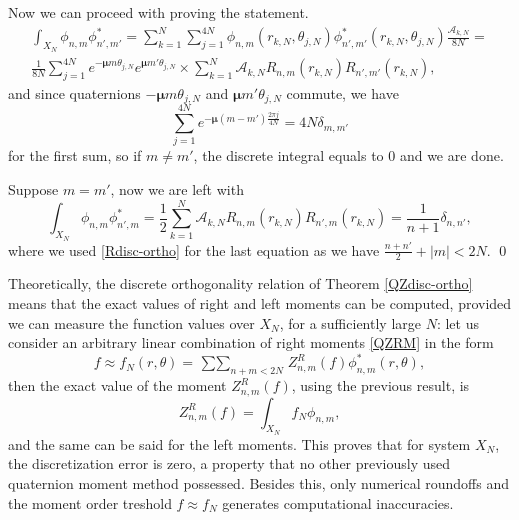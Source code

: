 \documentclass[12pt]{article}
\newcommand{\qmu}{\boldsymbol{\mu}}
\begin{document}
Now we can proceed with proving the statement. 
\[
\begin{gathered}
	\int_{X_N} \phi_{n,m} \phi^*_{n',m'} = \sum_{k=1}^{N} \sum_{j=1}^{4N} \phi_{n,m}(r_{k,N},\theta_{j,N}) \phi^*_{n',m'}(r_{k,N},					\theta_{j,N}) \frac{\mathcal{A}_{k,N}}{8N} = \\
	\frac{1}{8N} \sum_{j=1}^{4N} e^{-\qmu m\theta_{j,N}}e^{\qmu m' \theta_{j,N}} \times \sum_{k=1}^N \mathcal{A}_{k,N} R_{n,m}(r_{k,N}) R_{n',m'}				(r_{k,N}),
\end{gathered}
\]
and since quaternions $-\qmu m\theta_{j,N}$ and $\qmu m' \theta_{j,N}$ commute, we have
\[
	\sum_{j=1}^{4N} e^{-\qmu (m-m')\frac{2\pi j}{4N}} = 4N\delta_{m,m'}
\]
for the first sum, so if $m\neq m'$, the discrete integral equals to $0$ and we are done.

Suppose $m=m'$, now we are left with
\[
	\int_{X_N} \phi_{n,m} \phi^*_{n',m} = \frac{1}{2} \sum_{k=1}^N \mathcal{A}_{k,N} R_{n,m}(r_{k,N}) R_{n',m}(r_{k,N}) = \frac{1}{n+1}\delta_{n,n'},
\]
where we used \eqref{Rdisc-ortho} for the last equation as we have $\frac{n+n'}{2}+|m| < 2N$.
\qed

Theoretically, the discrete orthogonality relation of Theorem \ref{QZdisc-ortho} means that the exact values of right and left moments can be computed, provided we can measure the function values over $X_N$, for a sufficiently large $N$: let us consider an arbitrary linear combination of right moments \eqref{QZRM} in the form
\[
	f \approx f_N(r,\theta) = \mathop{\sum\sum}_{n+m<2N} Z^R_{n,m}(f) \phi^*_{n,m} (r,\theta),
\]
then the exact value of the moment $Z^R_{n,m}(f)$, using the previous result, is
\[
	Z^R_{n,m}(f) = \int_{X_N} f_N\phi_{n,m},
\]
and the same can be said for the left moments. This proves that for system $X_N$, the discretization error is zero, a property that no other previously used quaternion moment method possessed. Besides this, only numerical roundoffs and the moment order treshold $f \approx f_N$ generates computational inaccuracies.
\end{document}
